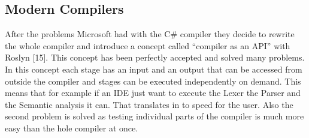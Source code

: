 \subsection{Modern Compilers}
After the problems Microsoft had with the C\# compiler they decide to rewrite the whole compiler and introduce a concept called “compiler as an API” with Roslyn [15]. This concept has been perfectly accepted and solved many problems. In this concept each stage has an input and an output that can be accessed from outside the compiler and stages can be executed independently on demand. This means that for example if an IDE just want to execute the Lexer the Parser and the Semantic analysis it can. That translates in to speed for the user.
Also the second problem is solved as testing individual parts of the compiler is much more easy than the hole compiler at once.
